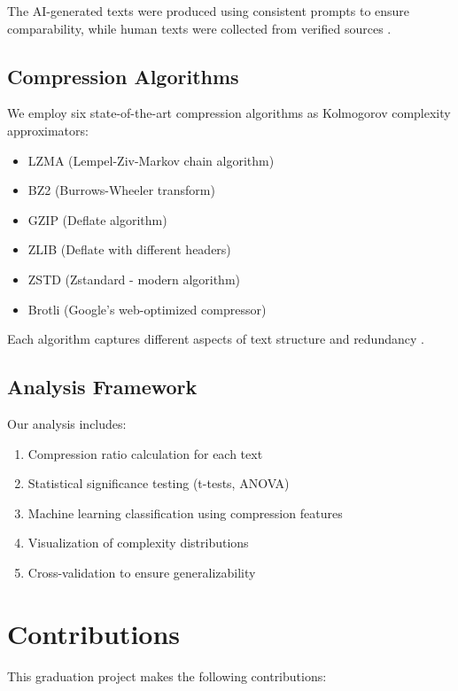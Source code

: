\documentclass[12pt,a4paper]{report}
\begin{document}
The AI-generated texts were produced using consistent prompts to ensure comparability, while human texts were collected from verified sources \cite{solaiman2019detecting}.

\subsection{Compression Algorithms}

We employ six state-of-the-art compression algorithms as Kolmogorov complexity approximators:
\begin{itemize}
    \item LZMA (Lempel-Ziv-Markov chain algorithm)
    \item BZ2 (Burrows-Wheeler transform)
    \item GZIP (Deflate algorithm)
    \item ZLIB (Deflate with different headers)
    \item ZSTD (Zstandard - modern algorithm)
    \item Brotli (Google's web-optimized compressor)
\end{itemize}

Each algorithm captures different aspects of text structure and redundancy \cite{ziv1977universal}.

\subsection{Analysis Framework}

Our analysis includes:
\begin{enumerate}
    \item Compression ratio calculation for each text
    \item Statistical significance testing (t-tests, ANOVA)
    \item Machine learning classification using compression features
    \item Visualization of complexity distributions
    \item Cross-validation to ensure generalizability
\end{enumerate}

\section{Contributions}

This graduation project makes the following contributions:
\end{document}
